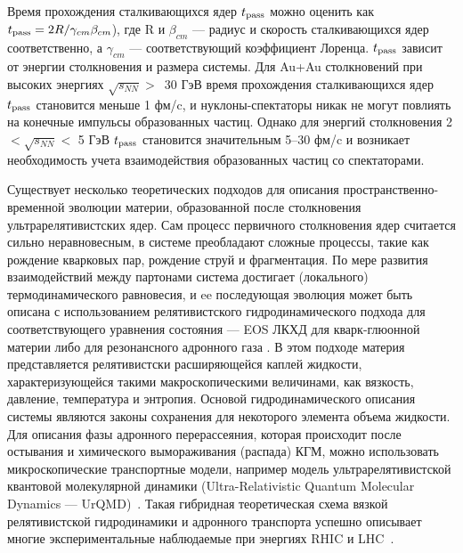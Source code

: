 Время прохождения сталкивающихся ядер $t_{\rm pass}$ можно оценить как $t_{\rm pass}= 2R/\gamma_{cm}\beta_{cm}$), где R и $\beta_{cm}$ --- радиус и скорость сталкивающихся ядер соответственно, а $\gamma_{cm}$ ---  соответствующий коэффициент Лоренца. 
$t_{\rm pass}$ зависит от энергии столкновения и размера системы.  
Для Au+Au столкновений при высоких энергиях $\sqrt{s_{NN}}>$~30 ГэВ время прохождения сталкивающихся ядер $t_{\rm pass}$ становится меньше 1 фм/c, и нуклоны-спектаторы никак не могут повлиять на конечные импульсы образованных частиц.
Однако для энергий столкновения 2$ < \sqrt{s_{NN}} < $  5 ГэВ $t_{\rm pass}$  становится значительным 5--30 фм/c и возникает необходимость учета взаимодействия образованных частиц со спектаторами.

Существует несколько теоретических подходов для описания пространственно-временной эволюции материи, образованной после столкновения ультрарелятивистских ядер.
Сам процесс первичного столкновения ядер считается сильно неравновесным,  в системе преобладают сложные процессы, такие как рождение кварковых пар, рождение струй и фрагментация.
По мере развития взаимодействий между партонами система достигает (локального) термодинамического равновесия, и ee последующая эволюция  может быть описана с использованием релятивистского гидродинамического подхода для соответствующего уравнения состояния --- EOS ЛКХД для кварк-глюонной материи либо для резонансного адронного газа \cite{Stoecker:1986ci,Hung:1994eq,Werner:2010aa}.
В этом подходе материя представляется релятивистски расширяющейся каплей жидкости, характеризующейся такими макроскопическими величинами, как вязкость, давление, температура и энтропия. 
Основой гидродинамического описания системы являются законы сохранения для некоторого элемента объема жидкости. 
Для описания  фазы адронного перерассеяния, которая происходит после остывания и химического вымораживания (распада) КГМ, можно использовать микроскопические транспортные модели, например модель ультрарелятивистской квантовой моле­кулярной динамики (Ultra-Relativistic Quantum Molecular Dynamics — UrQMD)~\cite{bass1998microscopic,bleicher1999relativistic}.
Такая гибридная теоретическая схема вязкой релятивистской гидродинамики и адронного  транспорта  успешно описывает многие экспериментальные наблюдаемые при энергиях RHIC и  LHC~\cite{petersen2008fully}.

